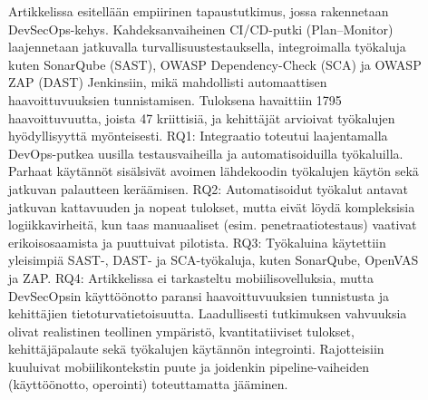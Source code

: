 \documentclass[bscthesis,finnish,oneside,biblatex]{uefcsthesis}
\begin{document}
\begin{description}
    \item[\cite{feio2024_empirical}] Artikkelissa esitellään empiirinen tapaustutkimus, jossa rakennetaan DevSecOps-kehys. Kahdeksanvaiheinen CI/CD-putki (Plan–Monitor) laajennetaan jatkuvalla turvallisuustestauksella, integroimalla työkaluja kuten SonarQube (SAST), OWASP Dependency-Check (SCA) ja OWASP ZAP (DAST) Jenkinsiin, mikä mahdollisti automaattisen haavoittuvuuksien tunnistamisen. Tuloksena havaittiin 1795 haavoittuvuutta, joista 47 kriittisiä, ja kehittäjät arvioivat työkalujen hyödyllisyyttä myönteisesti. RQ1: Integraatio toteutui laajentamalla DevOps-putkea uusilla testausvaiheilla ja automatisoiduilla työkaluilla. Parhaat käytännöt sisälsivät avoimen lähdekoodin työkalujen käytön sekä jatkuvan palautteen keräämisen. RQ2: Automatisoidut työkalut antavat jatkuvan kattavuuden ja nopeat tulokset, mutta eivät löydä kompleksisia logiikkavirheitä, kun taas manuaaliset (esim. penetraatiotestaus) vaativat erikoisosaamista ja puuttuivat pilotista. RQ3: Työkaluina käytettiin yleisimpiä SAST-, DAST- ja SCA-työkaluja, kuten SonarQube, OpenVAS ja ZAP. RQ4: Artikkelissa ei tarkasteltu mobiilisovelluksia, mutta DevSecOpsin käyttöönotto paransi haavoittuvuuksien tunnistusta ja kehittäjien tietoturvatietoisuutta. Laadullisesti tutkimuksen vahvuuksia olivat realistinen teollinen ympäristö, kvantitatiiviset tulokset, kehittäjäpalaute sekä työkalujen käytännön integrointi. Rajotteisiin kuuluivat mobiilikontekstin puute ja joidenkin pipeline-vaiheiden (käyttöönotto, operointi) toteuttamatta jääminen.
\end{description}
\end{document}
